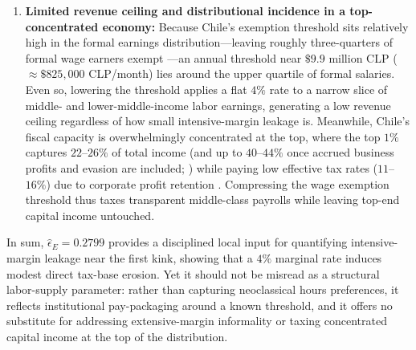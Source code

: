 \begin{enumerate}
    \item \textbf{Limited revenue ceiling and distributional incidence in a top-concentrated economy:} Because Chile's exemption threshold sits relatively high in the formal earnings distribution---leaving roughly three-quarters of formal wage earners exempt \parencite{gutierrezNoExemption}---an annual threshold near $\$9.9$ million CLP ($\approx \$825{,}000$ CLP/month) lies around the upper quartile of formal salaries. Even so, lowering the threshold applies a flat $4\%$ rate to a narrow slice of middle- and lower-middle-income labor earnings, generating a low revenue ceiling regardless of how small intensive-margin leakage is. Meanwhile, Chile's fiscal capacity is overwhelmingly concentrated at the top, where the top $1\%$ captures $22$--$26\%$ of total income (and up to $40$--$44\%$ once accrued business profits and evasion are included; \parencite{fairfield2016top,flores2020top}) while paying low effective tax rates ($11$--$16\%$) due to corporate profit retention \parencite{bohme2022diagnostico}. Compressing the wage exemption threshold thus taxes transparent middle-class payrolls while leaving top-end capital income untouched.
\end{enumerate}

In sum, $\hat{\epsilon}_E = 0.2799$ provides a disciplined local input for quantifying intensive-margin leakage near the first kink, showing that a $4\%$ marginal rate induces modest direct tax-base erosion. Yet it should not be misread as a structural labor-supply parameter: rather than capturing neoclassical hours preferences, it reflects institutional pay-packaging around a known threshold, and it offers no substitute for addressing extensive-margin informality or taxing concentrated capital income at the top of the distribution.